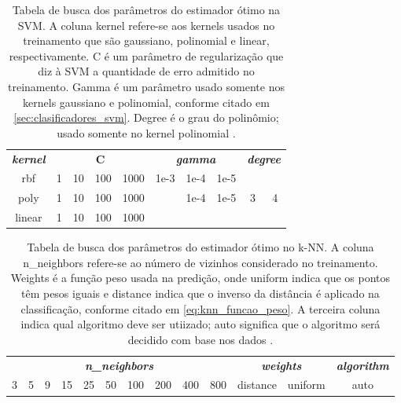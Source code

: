 \begin{table}[!htpb]
\centering
\begin{small}
\setlength{\tabcolsep}{10pt}

\begin{tabular}{|c|c|c|c|c|c|c|c|c|c|}\hline
 \emph{\textbf{kernel}} & \multicolumn{4}{c|}{\textbf{C}} & \multicolumn{3}{c|}{\emph{\textbf{gamma}}} & \multicolumn{2}{c|}{\emph{\textbf{degree}}}\\ \cline{1-10}
rbf    & 1 & 10 & 100 & 1000 & 1e-3 & 1e-4 & 1e-5 &   &   \\ \hline
poly   & 1 & 10 & 100 & 1000 &      & 1e-4 & 1e-5 & 3 & 4 \\ \hline
linear & 1 & 10 & 100 & 1000 &      &      &      &   &   \\ \hline

\end{tabular}
\end{small}
\caption[Tabela de busca dos parâmetros do estimador ótimo na SVM]{Tabela de busca dos parâmetros do estimador ótimo na SVM. A coluna kernel refere-se aos kernels usados no treinamento que são gaussiano, polinomial e linear, respectivamente. C é um parâmetro de regularização que diz à SVM a quantidade de erro admitido no treinamento. Gamma é um parâmetro usado somente nos kernels gaussiano e polinomial, conforme citado em \ref{sec:clasificadores_svm}. Degree é o grau do polinômio; usado somente no kernel polinomial \citep{scikit-learn:11}.}
\label{tab:svm_tabela_busca}
\end{table}

\begin{table}[!htpb]
\centering
\begin{small}
\setlength{\tabcolsep}{8pt}

\begin{tabular}{|c|c|c|c|c|c|c|c|c|c|c|c|c|}\hline
 \multicolumn{10}{|c|}{\emph{\textbf{n\_neighbors}}} & \multicolumn{2}{c|}{\emph{\textbf{weights}}} & \multicolumn{1}{c|}{\emph{\textbf{algorithm}}}\\ \cline{1-13}
3 & 5 & 9 & 15 & 25 & 50 & 100 & 200 & 400 & 800 & distance & uniform & auto \\ \hline

\end{tabular} 
\end{small}
\caption[Tabela de busca dos parâmetros do estimador ótimo no $k$-NN]{Tabela de busca dos parâmetros do estimador ótimo no k-NN. A coluna n\_neighbors refere-se ao número de vizinhos considerado no treinamento. Weights é a função peso usada na predição, onde uniform indica que os pontos têm pesos iguais e distance indica que o inverso da distância é aplicado na classificação, conforme citado em \ref{eq:knn_funcao_peso}. A terceira coluna indica qual algoritmo deve ser utiizado; auto significa que o algoritmo será decidido com base nos dados \citep{scikit-learn:11}.}
\label{tab:knn_tabela_busca}
\end{table}

